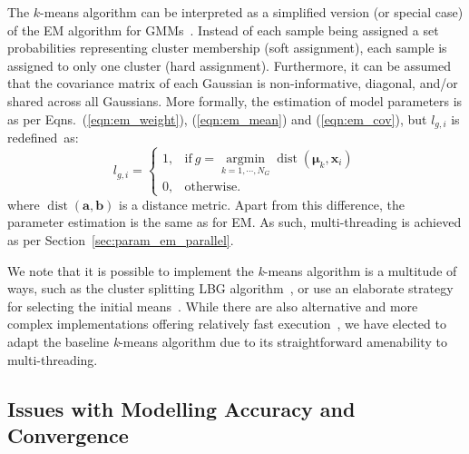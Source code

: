 \documentclass[10pt,a4paper]{article}
\DeclareMathOperator*{\argmin}{argmin}
\def\Vec#1{{\boldsymbol{#1}}}
\begin{document}
The $k$-means algorithm can be interpreted as a simplified version (or special case) of the EM algorithm for GMMs~\cite{Kulis_2012}.
Instead of each sample being assigned a set probabilities representing cluster membership (soft assignment),
each sample is assigned to only one cluster (hard assignment).
Furthermore, it can be assumed that the covariance matrix of each Gaussian is non-informative, diagonal, and/or shared across all Gaussians.
More formally, the estimation of model parameters is as per Eqns.~(\ref{eqn:em_weight}), (\ref{eqn:em_mean}) and (\ref{eqn:em_cov}), 
but $l_{g,i}$ is redefined~as:%
%
\begin{equation}
  l_{g,i} = \left\{
  \begin{array}{ll}
  1, & \mbox{if} ~ g = \argmin\limits_{k=1, \cdots, N_G} \operatorname{dist}(\Vec{\mu}_k, \Vec{x}_i) \\
  0, & \mbox{otherwise}.
  \end{array}
  \right.
  \label{eqn:binary_likelihood}
\end{equation}
%
where {$\operatorname{dist}(\Vec{a}, \Vec{b})$} is a distance metric.
Apart from this difference, the parameter estimation is the same as for EM.
As such, multi-threading is achieved as per Section~\ref{sec:param_em_parallel}.

We note that it is possible to implement the \mbox{{\it k}-means} algorithm is a multitude of ways,
such as the cluster splitting LBG algorithm~\cite{Linde80},
or use an elaborate strategy for selecting the initial means~\cite{Arthur_2007}.
While there are also alternative and more complex implementations offering relatively fast execution~\cite{Elkan_2003},
we have elected to adapt the baseline \mbox{{\it k}-means} algorithm due to its straightforward amenability to multi-threading. 



\subsection{Issues with Modelling Accuracy and Convergence}
\end{document}

